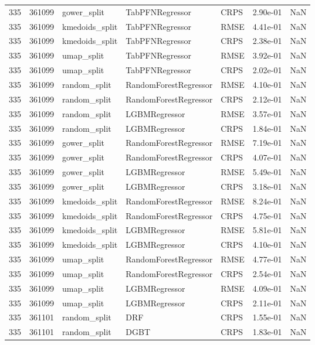 \begin{tabular}{rrlllrr}
335 & 361099 & gower\_split & TabPFNRegressor & CRPS & 2.90e-01 & NaN \\
335 & 361099 & kmedoids\_split & TabPFNRegressor & RMSE & 4.41e-01 & NaN \\
335 & 361099 & kmedoids\_split & TabPFNRegressor & CRPS & 2.38e-01 & NaN \\
335 & 361099 & umap\_split & TabPFNRegressor & RMSE & 3.92e-01 & NaN \\
335 & 361099 & umap\_split & TabPFNRegressor & CRPS & 2.02e-01 & NaN \\
335 & 361099 & random\_split & RandomForestRegressor & RMSE & 4.10e-01 & NaN \\
335 & 361099 & random\_split & RandomForestRegressor & CRPS & 2.12e-01 & NaN \\
335 & 361099 & random\_split & LGBMRegressor & RMSE & 3.57e-01 & NaN \\
335 & 361099 & random\_split & LGBMRegressor & CRPS & 1.84e-01 & NaN \\
335 & 361099 & gower\_split & RandomForestRegressor & RMSE & 7.19e-01 & NaN \\
335 & 361099 & gower\_split & RandomForestRegressor & CRPS & 4.07e-01 & NaN \\
335 & 361099 & gower\_split & LGBMRegressor & RMSE & 5.49e-01 & NaN \\
335 & 361099 & gower\_split & LGBMRegressor & CRPS & 3.18e-01 & NaN \\
335 & 361099 & kmedoids\_split & RandomForestRegressor & RMSE & 8.24e-01 & NaN \\
335 & 361099 & kmedoids\_split & RandomForestRegressor & CRPS & 4.75e-01 & NaN \\
335 & 361099 & kmedoids\_split & LGBMRegressor & RMSE & 5.81e-01 & NaN \\
335 & 361099 & kmedoids\_split & LGBMRegressor & CRPS & 4.10e-01 & NaN \\
335 & 361099 & umap\_split & RandomForestRegressor & RMSE & 4.77e-01 & NaN \\
335 & 361099 & umap\_split & RandomForestRegressor & CRPS & 2.54e-01 & NaN \\
335 & 361099 & umap\_split & LGBMRegressor & RMSE & 4.09e-01 & NaN \\
335 & 361099 & umap\_split & LGBMRegressor & CRPS & 2.11e-01 & NaN \\
335 & 361101 & random\_split & DRF & CRPS & 1.55e-01 & NaN \\
335 & 361101 & random\_split & DGBT & CRPS & 1.83e-01 & NaN \\

\end{tabular}
